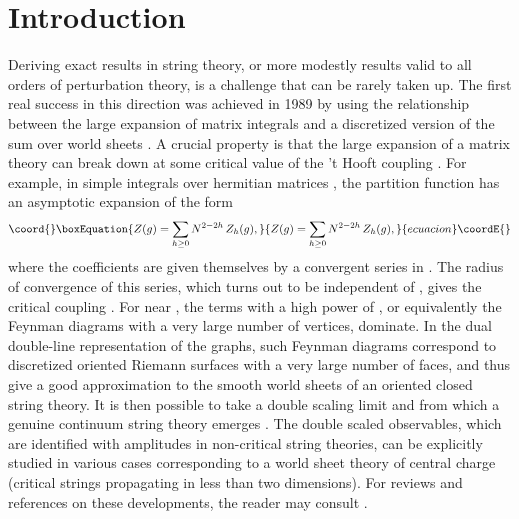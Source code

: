 \documentclass[a4paper,12pt]{article}
\begin{document}
\section{Introduction}
%
Deriving exact results in string theory, or more modestly results
valid to all orders of perturbation theory, is a challenge that can be 
rarely taken up. The first real success in this direction was achieved in 
1989 \cite{BK} by using the relationship between the large \coordHE{} expansion 
of matrix integrals and a discretized version of the sum over world sheets
\cite{tHooft,DK}. A crucial property is that the large \coordHE{}
expansion of a matrix theory can break down at some critical value 
\coordHE{} of the 't Hooft coupling \coordHE{}. For example, in simple
integrals over hermitian matrices \cite{IZ},
the partition function has an asymptotic expansion of the form
%
\begin{equation}\coord{}\boxEquation{
\label{Zexp}
Z(g) = \sum_{h\geq 0} N^{2 -2h}\, Z_h(g),
}{
Z(g) = \sum_{h\geq 0} N^{2 -2h}\, Z_h(g),
}{ecuacion}\coordE{}\end{equation}
%
where the coefficients \coordHE{} are given themselves by a convergent
series in
\coordHE{}. The radius of convergence of this series, which turns out to be
independent of \coordHE{}, gives the critical
coupling \coordHE{}. For \coordHE{} near \coordHE{}, the terms with a high
power of \coordHE{}, or equivalently the Feynman diagrams with a very large
number of vertices, dominate. In the dual double-line representation of
the graphs, such Feynman diagrams correspond to discretized oriented
Riemann surfaces with a very large number of faces, and thus
give a good approximation to the smooth world sheets of an oriented closed 
string theory. It is then possible to take a double scaling limit
\coordHE{} and \coordHE{} from which a genuine
continuum string theory emerges \cite{BK}. 
The double scaled observables, which
are identified with amplitudes in non-critical string theories, 
can be explicitly studied in various cases corresponding to a world
sheet theory of central charge \coordHE{} (critical strings propagating in
less than two dimensions). For reviews and references on these
developments, the reader may consult \cite{review}.
\end{document}
